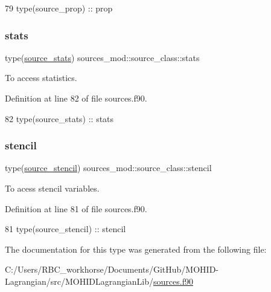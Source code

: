 \begin{DoxyCode}
79         \textcolor{keywordtype}{type}(source\_prop)  :: prop
\end{DoxyCode}
\mbox{\label{structsources__mod_1_1source__class_a2ed110f187434e6b6345f21822993517}} 
\subsubsection{\texorpdfstring{stats}{stats}}
{\footnotesize\ttfamily type(\mbox{\hyperlink{structsources__mod_1_1source__stats}{source\+\_\+stats}}) sources\+\_\+mod\+::source\+\_\+class\+::stats\hspace{0.3cm}{\ttfamily [private]}}



To access statistics. 



Definition at line 82 of file sources.\+f90.


\begin{DoxyCode}
82         \textcolor{keywordtype}{type}(source\_stats) :: stats
\end{DoxyCode}
\mbox{\label{structsources__mod_1_1source__class_a7950d4033c4b4be466479fc8a11dad1c}} 
\subsubsection{\texorpdfstring{stencil}{stencil}}
{\footnotesize\ttfamily type(\mbox{\hyperlink{structsources__mod_1_1source__stencil}{source\+\_\+stencil}}) sources\+\_\+mod\+::source\+\_\+class\+::stencil\hspace{0.3cm}{\ttfamily [private]}}



To acess stencil variables. 



Definition at line 81 of file sources.\+f90.


\begin{DoxyCode}
81         \textcolor{keywordtype}{type}(source\_stencil) :: stencil
\end{DoxyCode}


The documentation for this type was generated from the following file\+:\begin{DoxyCompactItemize}
\item 
C\+:/\+Users/\+R\+B\+C\+\_\+workhorse/\+Documents/\+Git\+Hub/\+M\+O\+H\+I\+D-\/\+Lagrangian/src/\+M\+O\+H\+I\+D\+Lagrangian\+Lib/\mbox{\hyperlink{sources_8f90}{sources.\+f90}}\end{DoxyCompactItemize}
